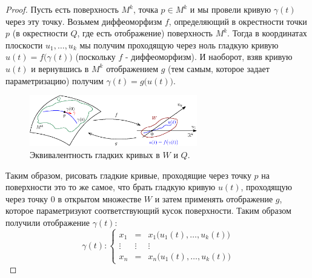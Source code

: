 \documentclass[12pt]{article}
\theoremstyle{definition}
\begin{document}
\begin{proof}
	Пусть есть поверхность $M^k$, точка $p \in M^k$ и мы провели кривую $\gamma(t)$ через эту точку. Возьмем диффеоморфизм $f$, определяющий в окрестности точки $p$ (в окрестности $Q$, где есть отображение) поверхность $M^k$. Тогда в координатах плоскости $u_1,\dotsc, u_k$ мы получим проходящую через ноль гладкую кривую $u(t) = f\big(\gamma(t)\big)$ (поскольку $f$ - диффеоморфизм). И наоборот, взяв кривую $u(t)$ и вернувшись в $M^k$ отображением $g$ (тем самым, которое задает параметризацию) получим $\gamma(t) = g\big(u(t)\big)$.
	\begin{figure}[H]
		\centering
		\includegraphics[width=0.65\textwidth]{19_10.eps}
		\caption{Эквивалентность гладких кривых в $W$ и $Q$.}
		\label{19_10}
	\end{figure}
	 Таким образом, рисовать гладкие кривые, проходящие через точку $p$ на поверхности это то же самое, что брать гладкую кривую $u(t)$, проходящую через точку $0$ в открытом множестве $W$ и затем применять отображение $g$, которое параметризуют соответствующий кусок поверхности. Таким образом получили отображение $\gamma(t)$:
	 $$
	 	\gamma(t)\colon \left\{
	 	\begin{array}{ccc}
	 		x_1& = &x_1\big(u_1(t),\dotsc, u_k(t)\big) \\
	 		\vdots & \vdots & \vdots \\
	 		x_n& = &x_n\big(u_1(t),\dotsc, u_k(t)\big)
	 	\end{array}\right.
	 $$
	 

\end{proof}
\end{document}
